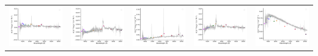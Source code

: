 \begin{center}
\begin{longtable}{l l l l l }
    \includegraphics[width=0.2\linewidth, clip]{Figs/Figs-sdss/spec-4217-55478-0796-STRIPE82-0004-029068.pdf} & \includegraphics[width=0.2\linewidth, clip]{Figs/Figs-sdss/spec-4219-55480-0333-STRIPE82-0009-033328.pdf} & \includegraphics[width=0.2\linewidth, clip]{Figs/Figs-sdss/spec-4234-55478-0651-STRIPE82-0044-019857.pdf} & \includegraphics[width=0.2\linewidth, clip]{Figs/Figs-sdss/spec-4236-55479-0206-STRIPE82-0049-010030.pdf} & \includegraphics[width=0.2\linewidth, clip]{Figs/Figs-sdss/spec-4237-55478-0412-STRIPE82-0049-025567.pdf} \\

\end{longtable}
\end{center}
